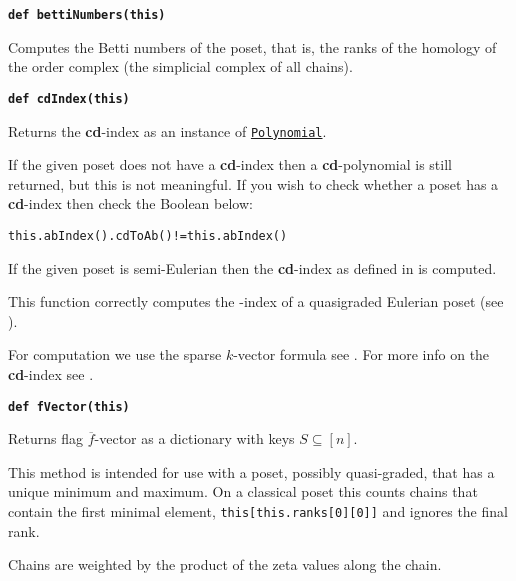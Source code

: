 \documentclass[12pt]{article}
\begin{document}
\begin{child}
{{}\endlist}

\textbf{\hypertarget{Poset.bettiNumbers}{\texttt{def bettiNumbers(this)}}}
{\list{}{\leftmargin 0.5cm}\item{
Computes the Betti numbers of the poset, that is, the ranks of the homology of the order complex (the simplicial complex of all chains).


}\endlist}

\textbf{\hypertarget{Poset.cdIndex}{\texttt{def cdIndex(this)}}}
{\list{}{\leftmargin 0.5cm}\item{
Returns the \textbf{cd}-index as an instance of \hyperlink{Polynomial}{\texttt{Polynomial}}.

If the given poset
does not have a \textbf{cd}-index then a \textbf{cd}-polynomial is still
returned, but this is not meaningful. If you wish to check whether a poset has
a \textbf{cd}-index then check the Boolean below:
\begin{center}
        \verb|this.abIndex().cdToAb()!=this.abIndex()|
\end{center}

If the given poset is semi-Eulerian then the \textbf{cd}-index
as defined in \cite{juhnke-kubitzke-24} is computed.

This function correctly computes the \cv\dv-index
of a quasigraded Eulerian poset (see \cite{ehrenborg-goresky-readdy-15}).

For computation we use the sparse $k$-vector formula see \cite[Proposition 7.1]{billera-ehrenborg-00}. For more info on the \textbf{cd}-index see \cite{bayer-21}.


}\endlist}

\textbf{\hypertarget{Poset.fVector}{\texttt{def fVector(this)}}}
{\list{}{\leftmargin 0.5cm}\item{
Returns flag $\overline{f}$-vector as a dictionary with keys $S\subseteq[n]$.

This method is intended for use with a poset, possibly quasi-graded, that has a unique minimum and maximum. On a classical poset this counts chains that contain the first
minimal element, \verb|this[this.ranks[0][0]]| and ignores the
final rank. 

Chains are weighted by the product of the zeta
values along the chain.


}}
\end{child}
\end{document}
